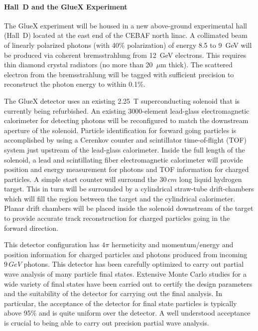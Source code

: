 \paragraph{Hall~D and the GlueX Experiment}

The GlueX experiment will be housed in a new above-ground experimental hall
(Hall~D) located at the east end of the CEBAF north linac. A collimated beam 
of linearly polarized photons (with 40\% polarization) of energy 8.5 to 9~GeV 
will be produced via coherent bremsstrahlung from 12~GeV electrons. This 
requires thin diamond  crystal radiators (no more than 20~$\mu$m thick). 
The scattered electron from the bremsstrahlung will be tagged with sufficient 
precision to reconstruct the photon energy to within 0.1\%.


\hspace{1cm}
The GlueX detector uses an existing 2.25~T 
superconducting solenoid that is currently being refurbished.  An existing 
3000-element lead-glass electromagnetic calorimeter for detecting photons 
will be reconfigured 
to match the downstream aperture of the solenoid. 
Particle identification for forward going particles
is accomplished by using a Cerenkov counter 
and scintillator time-of-flight (TOF) system just upstream of the lead-glass 
calorimeter. 
Inside the full length of the solenoid,
a lead and scintillating fiber electromagnetic calorimeter will provide 
position and energy measurement for photons and TOF information for charged 
particles.  A simple start counter will surround the $30\, cm$ long liquid hydrogen
target. This in turn will be surrounded by a cylindrical straw-tube drift-chambers 
which will fill the region between the target and the cylindrical calorimeter.  
Planar drift chambers will be placed inside the solenoid downstream of the target
to provide accurate track reconstruction for charged particles going in the 
forward direction.


\hspace{1cm}
This detector configuration has $4 \pi$ hermeticity and momentum/energy and
position information for charged particles and photons produced from 
incoming $9\, GeV$ photons. This detector has been carefully optimized to 
carry out partial wave analysis of many particle final states.  Extensive Monte 
Carlo studies for a wide variety of final states have been carried out to 
certify the design parameters and the suitability of the detector for carrying 
out the final analysis. In particular, the acceptance of the detector for
final state particles is typically above 95\% and is quite uniform over 
the detector. A well understood acceptance is crucial to being able to carry
out precision partial wave analysis. 


